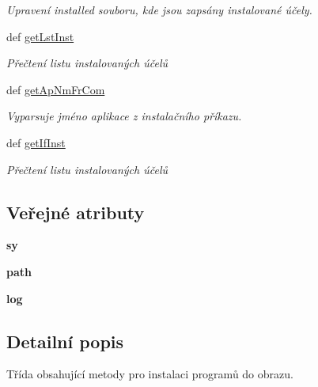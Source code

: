 \begin{DoxyCompactItemize}
\begin{DoxyCompactList}\small\item\em Upravení installed souboru, kde jsou zapsány instalované účely. \end{DoxyCompactList}\item 
def \hyperlink{classinFocus_1_1inFocus_af6094d372c354e903a9c9e12eed838e0}{get\-Lst\-Inst}
\begin{DoxyCompactList}\small\item\em Přečtení listu instalovaných účelů \end{DoxyCompactList}\item 
def \hyperlink{classinFocus_1_1inFocus_a7cdf0f46165d73f2474d2d856a79b8f1}{get\-Ap\-Nm\-Fr\-Com}
\begin{DoxyCompactList}\small\item\em Vyparsuje jméno aplikace z instalačního příkazu. \end{DoxyCompactList}\item 
def \hyperlink{classinFocus_1_1inFocus_aadfed74ffb6dc74f74fd2266dca70e0d}{get\-If\-Inst}
\begin{DoxyCompactList}\small\item\em Přečtení listu instalovaných účelů \end{DoxyCompactList}\end{DoxyCompactItemize}
\subsection*{Veřejné atributy}
\begin{DoxyCompactItemize}
\item 
\hypertarget{classinFocus_1_1inFocus_ae2b30d87560fa79d4676507a0edc476e}{{\bfseries sy}}\label{d3/d33/classinFocus_1_1inFocus_ae2b30d87560fa79d4676507a0edc476e}

\item 
\hypertarget{classinFocus_1_1inFocus_a49c854019791b3c216135e1ce7881aaa}{{\bfseries path}}\label{d3/d33/classinFocus_1_1inFocus_a49c854019791b3c216135e1ce7881aaa}

\item 
\hypertarget{classinFocus_1_1inFocus_a8f419c1bc959a1a56ff8fc522c7cf405}{{\bfseries log}}\label{d3/d33/classinFocus_1_1inFocus_a8f419c1bc959a1a56ff8fc522c7cf405}

\end{DoxyCompactItemize}


\subsection{Detailní popis}
Třída obsahující metody pro instalaci programů do obrazu. 

